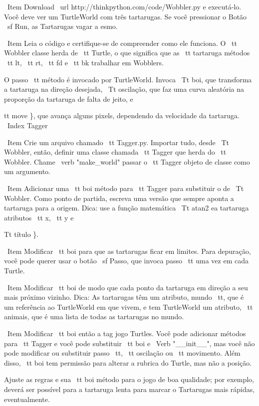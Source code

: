 \documentclass[10pt]{book}
\begin{document}
{{{{{{{{{{{{{{{{{\ Item Download \ url {} http://thinkpython.com/code/Wobbler.py e executá-lo. Você
deve ver um TurtleWorld com três tartarugas. Se você pressionar o
Botão {\ sf Run}, as Tartarugas vagar a esmo.

\ Item Leia o código e certifique-se de compreender como ele funciona.
O {\ tt Wobbler} classe herda de {\ tt Turtle}, o que significa
que as {\ tt tartaruga} métodos {\ tt lt}, {\ tt rt}, {\ tt fd}
e {\ tt bk} trabalhar em Wobblers.

O passo {\ tt} método é invocado por TurtleWorld. Invoca
{\ Tt boi}, que transforma a tartaruga na direção desejada,
{\ Tt oscilação}, que faz uma curva aleatória na proporção da tartaruga de
falta de jeito, e {tt move \}, que avança alguns pixels,
dependendo da velocidade da tartaruga.
\ Index {} Tagger

\ Item Crie um arquivo chamado {\ tt Tagger.py}. Importar tudo, desde
  {\ Tt Wobbler}, então, definir uma classe chamada {\ tt Tagger} que herda
  do {\ tt Wobbler}. Chame \ verb "make_world" passar o {\ tt
    Tagger} objeto de classe como um argumento.

\ Item Adicionar uma {\ tt boi} método para {\ tt Tagger} para substituir o de
  {\ Tt Wobbler}. Como ponto de partida, escreva uma versão que sempre
  aponta a tartaruga para a origem. Dica: use a função matemática
  {\ Tt atan2} ea tartaruga atributos {\ tt x}, {\ tt y} e
  {Tt título \}.

\ Item Modificar {\ tt boi} para que as tartarugas ficar em limites.
  Para depuração, você pode querer usar o botão {\ sf Passo},
  que invoca {passo \ tt} uma vez em cada Turtle.

\ Item Modificar {\ tt boi} de modo que cada ponto da tartaruga em direção a seu mais próximo
  vizinho. Dica: As tartarugas têm um atributo, {mundo \ tt}, que é um
  referência ao TurtleWorld em que vivem, e tem TurtleWorld
  um atributo, {\ tt animais}, que é uma lista de todas as tartarugas no
  mundo.

\ Item Modificar {\ tt boi} então a tag jogo Turtles. Você pode adicionar métodos
  para {\ tt Tagger} e você pode substituir {\ tt boi} e
  \ Verb "__init__", mas você não pode modificar ou substituir {passo \ tt}, {\ tt
    oscilação} ou {\ tt movimento}. Além disso, {\ tt boi} tem permissão para alterar a
  rubrica do Turtle, mas não a posição.

Ajuste as regras e sua {\ tt boi} método para o jogo de boa qualidade;
por exemplo, deverá ser possível para a tartaruga lenta para marcar o
Tartarugas mais rápidas, eventualmente.

}}}}}}}}}}}}}}}}}}}
\end{document}
